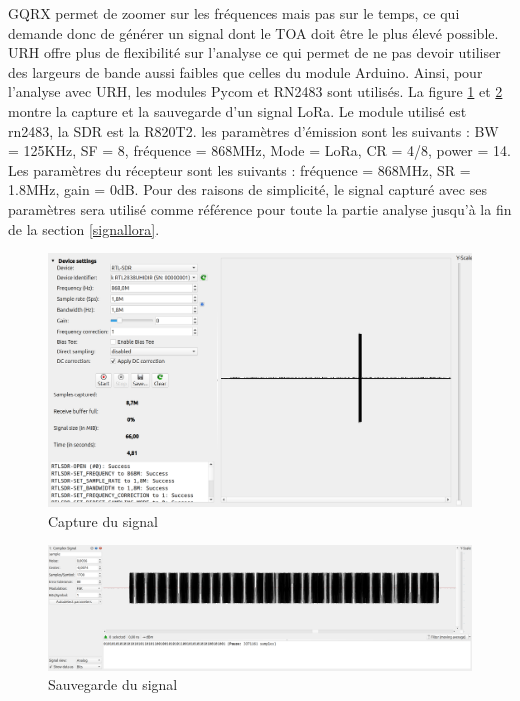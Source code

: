 GQRX permet de zoomer sur les fréquences mais pas sur le temps, ce qui demande donc de générer un signal dont le \ac{TOA} doit être le plus élevé possible. \ac{URH} offre plus de flexibilité sur l'analyse ce qui permet de ne pas devoir utiliser des largeurs de bande aussi faibles que celles du module Arduino. Ainsi, pour l'analyse avec \ac{URH}, les modules Pycom et RN2483 sont utilisés. La figure \ref{term303} et \ref{term304} montre la capture et la sauvegarde d'un signal LoRa. Le module utilisé est rn2483, la SDR est la R820T2. les paramètres d'émission sont les suivants : \ac{BW} = 125KHz, \ac{SF} = 8, fréquence = 868MHz, Mode = \ac{LoRa}, \ac{CR} = 4/8, power = 14. Les paramètres du récepteur sont les suivants : fréquence = 868MHz, \ac{SR} = 1.8MHz, gain = 0dB. Pour des raisons de simplicité, le signal capturé avec ses paramètres sera utilisé comme référence pour toute la partie analyse jusqu'à la fin de la section \ref{signallora}.

\newpage

\begin{figure}[h]
\centering

\includegraphics[scale=0.17]{images/urh2n.png}
\caption{Capture du signal}
\label{term303}
\end{figure}

\begin{figure}[h]
\centering

\includegraphics[scale=0.11]{images/urh3n.png}
\caption{Sauvegarde du signal}
\label{term304}
\end{figure}

